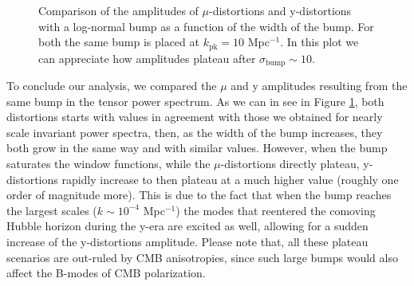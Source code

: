 \begin{figure}[!hb]
    \centering
{}
\caption{Comparison of the amplitudes of $\mu$-distortions  and y-distortions with a log-normal bump as a function of the width of the bump. For both the same bump is placed at $k_\text{pk}=10$ Mpc$^{-1}$. In this plot we can appreciate how amplitudes plateau after $\sigma_\text{bump}\sim 10$.}
\label{fig:muy_plateau}
\end{figure}

To conclude our analysis, we compared the $\mu$ and y amplitudes resulting from the same bump in the tensor power spectrum. As we can in see in Figure \ref{fig:muy_plateau}, both distortions starts with values in agreement with those we obtained for nearly scale invariant power spectra, then, as the width of the bump increases, they both grow in the same way and with similar values. However, when the bump saturates the window functions, while the $\mu$-distortions directly plateau, y-distortions rapidly increase to then plateau at a much higher value (roughly one order of magnitude more). This is due to the fact that when the bump reaches the largest scales ($k\sim10^{-4}$ Mpc$^{-1}$) the modes that reentered the comoving Hubble horizon during the y-era are excited as well, allowing for a sudden increase of the y-distortions amplitude. Please note that, all these plateau scenarios are out-ruled by CMB anisotropies, since such large bumps would also affect the B-modes of CMB polarization. 